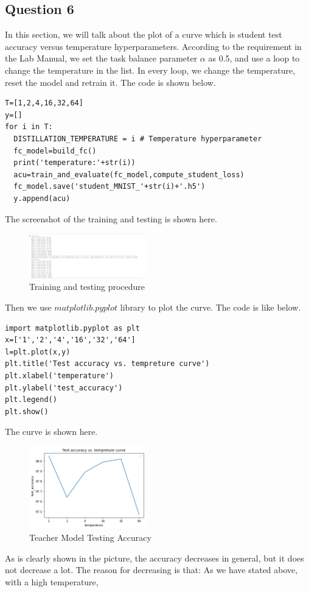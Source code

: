 \documentclass[conference]{IEEEtran}
\begin{document}
\subsection{Question 6}
In this section, we will talk about the plot of a curve which is student test accuracy versus temperature hyperparameters. 
According to the requirement in the Lab Manual, we set the task balance parameter $\alpha$ as 0.5, and use a loop to change the temperature in the list.
In every loop, we change the temperature, reset the model and retrain it. The code is shown below.
\begin{lstlisting}
T=[1,2,4,16,32,64]
y=[]
for i in T:
  DISTILLATION_TEMPERATURE = i # Temperature hyperparameter
  fc_model=build_fc()
  print('temperature:'+str(i))
  acu=train_and_evaluate(fc_model,compute_student_loss)
  fc_model.save('student_MNIST_'+str(i)+'.h5')
  y.append(acu)
\end{lstlisting}
The screenshot of the training and testing is shown here.
\begin{figure}[h] 
    \centering
    \includegraphics[width=0.45\textwidth]{./graphs/T1Q6_train.png}
    \caption{Training and testing procedure}
    \label{Fig.t1q3e}
\end{figure}
Then we use $matplotlib.pyplot$ library to plot the curve.
The code is like below.
\begin{lstlisting}
import matplotlib.pyplot as plt
x=['1','2','4','16','32','64']
l=plt.plot(x,y)
plt.title('Test accuracy vs. tempreture curve')
plt.xlabel('temperature')
plt.ylabel('test_accuracy')
plt.legend()
plt.show()
\end{lstlisting}
The curve is shown here.
\begin{figure}[h] 
    \centering
    \includegraphics[width=0.45\textwidth]{./graphs/accuracy_vs_temperature.png}
    \caption{Teacher Model Testing Accuracy}
    \label{Fig.t1q3e}
\end{figure}
As is clearly shown in the picture, the accuracy decreases in general, but it does not decrease a lot.
The reason for decreasing is that: As we have stated above, with a high temperature,
\end{document}
